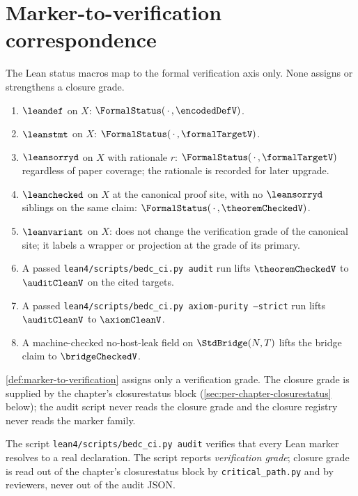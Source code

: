 \section{Marker-to-verification correspondence}
\label{sec:marker-to-verification}

\begin{definition}
\label{def:marker-to-verification}
The Lean status macros map to the formal verification axis only. None assigns or strengthens a closure grade.
\begin{enumerate}
  \item $\verb|\leandef|$ on $X$: $\FormalStatus(\,\cdot\,, \encodedDefV)$.
  \item $\verb|\leanstmt|$ on $X$: $\FormalStatus(\,\cdot\,, \formalTargetV)$.
  \item $\verb|\leansorryd|$ on $X$ with rationale $r$: $\FormalStatus(\,\cdot\,, \formalTargetV)$ regardless of paper coverage; the rationale is recorded for later upgrade.
  \item $\verb|\leanchecked|$ on $X$ at the canonical proof site, with no $\verb|\leansorryd|$ siblings on the same claim: $\FormalStatus(\,\cdot\,, \theoremCheckedV)$.
  \item $\verb|\leanvariant|$ on $X$: does not change the verification grade of the canonical site; it labels a wrapper or projection at the grade of its primary.
  \item A passed \texttt{lean4/scripts/bedc\_ci.py audit} run lifts $\theoremCheckedV$ to $\auditCleanV$ on the cited targets.
  \item A passed \texttt{lean4/scripts/bedc\_ci.py axiom-purity --strict} run lifts $\auditCleanV$ to $\axiomCleanV$.
  \item A machine-checked no-host-leak field on $\StdBridge(N, T)$ lifts the bridge claim to $\bridgeCheckedV$.
\end{enumerate}
\end{definition}

\begin{remark}
\label{rem:marker-map-not-closure}
\autoref{def:marker-to-verification} assigns only a verification grade. The closure grade is supplied by the chapter's closurestatus block (\autoref{sec:per-chapter-closurestatus} below); the audit script never reads the closure grade and the closure registry never reads the marker family.
\end{remark}

\begin{lemma}
\label{lem:audit-reflects-verification}
The script \texttt{lean4/scripts/bedc\_ci.py audit} verifies that every Lean marker resolves to a real declaration. The script reports \emph{verification grade}; closure grade is read out of the chapter's closurestatus block by \texttt{critical\_path.py} and by reviewers, never out of the audit JSON.
\end{lemma}

